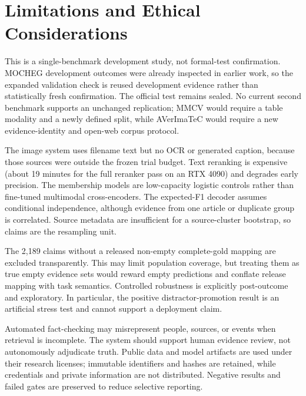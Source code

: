 \section{Limitations and Ethical Considerations}

This is a single-benchmark development study, not formal-test confirmation. MOCHEG development outcomes were already inspected in earlier work, so the expanded validation check is reused development evidence rather than statistically fresh confirmation. The official test remains sealed. No current second benchmark supports an unchanged replication; MMCV would require a table modality and a newly defined split, while AVerImaTeC would require a new evidence-identity and open-web corpus protocol.

The image system uses filename text but no OCR or generated caption, because those sources were outside the frozen trial budget. Text reranking is expensive (about 19 minutes for the full reranker pass on an RTX 4090) and degrades early precision. The membership models are low-capacity logistic controls rather than fine-tuned multimodal cross-encoders. The expected-F1 decoder assumes conditional independence, although evidence from one article or duplicate group is correlated. Source metadata are insufficient for a source-cluster bootstrap, so claims are the resampling unit.

The 2,189 claims without a released non-empty complete-gold mapping are excluded transparently. This may limit population coverage, but treating them as true empty evidence sets would reward empty predictions and conflate release mapping with task semantics. Controlled robustness is explicitly post-outcome and exploratory. In particular, the positive distractor-promotion result is an artificial stress test and cannot support a deployment claim.

Automated fact-checking may misrepresent people, sources, or events when retrieval is incomplete. The system should support human evidence review, not autonomously adjudicate truth. Public data and model artifacts are used under their research licenses; immutable identifiers and hashes are retained, while credentials and private information are not distributed. Negative results and failed gates are preserved to reduce selective reporting.
